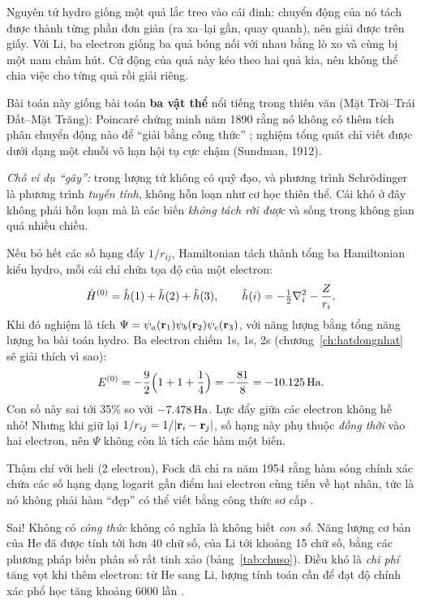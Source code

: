 \begin{eli5}
Nguyên tử hydro giống một quả lắc treo vào cái đinh: chuyển động của nó tách được thành từng phần đơn giản (ra xa--lại gần, quay quanh), nên giải được trên giấy. Với Li, ba electron giống ba quả bóng nối với nhau bằng lò xo và cùng bị một nam châm hút. Cử động của quả này kéo theo hai quả kia, nên không thể chia việc cho từng quả rồi giải riêng.

Bài toán này giống bài toán \textbf{ba vật thể} nổi tiếng trong thiên văn (Mặt Trời--Trái Đất--Mặt Trăng): Poincaré chứng minh năm 1890 rằng nó không có thêm tích phân chuyển động nào để ``giải bằng công thức'' \cite{Poincare1890}; nghiệm tổng quát chỉ viết được dưới dạng một chuỗi vô hạn hội tụ cực chậm (Sundman, 1912).

\emph{Chỗ ví dụ ``gãy'':} trong lượng tử không có quỹ đạo, và phương trình Schrödinger là phương trình \emph{tuyến tính}, không hỗn loạn như cơ học thiên thể. Cái khó ở đây không phải hỗn loạn mà là các biến \emph{không tách rời được} và sống trong không gian quá nhiều chiều.
\end{eli5}

\begin{congthuc}
Nếu bỏ hết các số hạng đẩy $1/r_{ij}$, Hamiltonian tách thành tổng ba Hamiltonian kiểu hydro, mỗi cái chỉ chứa tọa độ của một electron:
\[
\hat H^{(0)}=\hat h(1)+\hat h(2)+\hat h(3),\qquad \hat h(i)=-\tfrac12\nabla_i^2-\frac{Z}{r_i}.
\]
Khi đó nghiệm là tích $\Psi=\psi_a(\mathbf r_1)\psi_b(\mathbf r_2)\psi_c(\mathbf r_3)$, với năng lượng bằng tổng năng lượng ba bài toán hydro. Ba electron chiếm 1s, 1s, 2s (chương~\ref{ch:hatdongnhat} sẽ giải thích vì sao):
\[
E^{(0)}=-\frac{9}{2}\Big(1+1+\frac14\Big)=-\frac{81}{8}=-10.125\,\mathrm{Ha}.
\]
Con số này sai tới 35\% so với $-7.478\,\mathrm{Ha}$. Lực đẩy giữa các electron không hề nhỏ! Nhưng khi giữ lại $1/r_{ij}=1/|\mathbf r_i-\mathbf r_j|$, số hạng này phụ thuộc \emph{đồng thời} vào hai electron, nên $\Psi$ không còn là tích các hàm một biến.
\end{congthuc}

Thậm chí với heli (2 electron), Fock đã chỉ ra năm 1954 rằng hàm sóng chính xác chứa các số hạng dạng logarit gần điểm hai electron cùng tiến về hạt nhân, tức là nó không phải hàm ``đẹp'' có thể viết bằng công thức sơ cấp \cite{Simon2018}.

\begin{hieulam}[``không có nghiệm giải tích'' = ``không biết đáp án'']
Sai! Không có \emph{công thức} không có nghĩa là không biết \emph{con số}. Năng lượng cơ bản của He đã được tính tới hơn 40 chữ số, của Li tới khoảng 15 chữ số, bằng các phương pháp biến phân số rất tinh xảo (bảng~\ref{tab:chuso}). Điều khó là \emph{chi phí} tăng vọt khi thêm electron: từ He sang Li, lượng tính toán cần để đạt độ chính xác phổ học tăng khoảng 6000 lần \cite{Ruiz2021}.
\end{hieulam}

